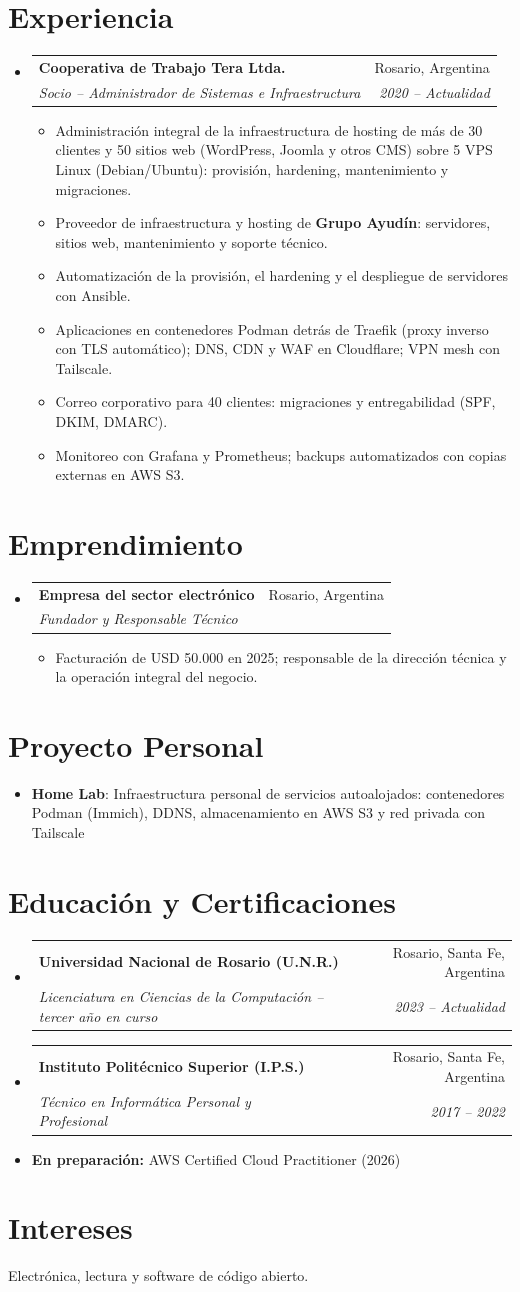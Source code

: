 \documentclass[letterpaper,10pt]{article}
\makeatletter
\newcommand{\resumeItem}[2]{
	\item\small{
		\textbf{#1}{: #2 \vspace{0.5mm}}
	}
}
\newcommand{\resumeItemx}[2]{
	\item\small{
		\textbf{#1}{#2 \vspace{0.5mm}}
	}
}
\newcommand{\resumeSubheading}[4]{
	\vspace{0.5mm}\item
	\begin{tabular*}{0.97\textwidth}[t]{l@{\extracolsep{\fill}}r}
		\textbf{#1} & #2 \vspace{0.5mm}\\
		\textit{\small#3} & \textit{\small #4} \\
	\end{tabular*}\vspace{0.5mm}
}
\newcommand{\resumeSubItem}[2]{\resumeItem{#1}{#2}\vspace{1pt}}
\newcommand{\resumeSubHeadingListStart}{\begin{itemize}[leftmargin=*]}
\newcommand{\resumeSubHeadingListEnd}{\end{itemize}\vspace{-4mm}}
\newcommand{\resumeItemListStart}{\begin{itemize}\vspace{-2pt}}
\newcommand{\resumeItemListEnd}{\end{itemize}\vspace{-2mm}}
\makeatother
\begin{document}
\section{Experiencia}
\resumeSubHeadingListStart
\resumeSubheading{Cooperativa de Trabajo Tera Ltda.}{Rosario, Argentina}{Socio -- Administrador de Sistemas e Infraestructura}{2020 -- Actualidad}
\resumeItemListStart
\resumeItemx{}{Administración integral de la infraestructura de hosting de más de 30 clientes y 50 sitios web (WordPress, Joomla y otros CMS) sobre 5 VPS Linux (Debian/Ubuntu): provisión, hardening, mantenimiento y migraciones.}
\resumeItemx{}{Proveedor de infraestructura y hosting de \textbf{Grupo Ayudín}: servidores, sitios web, mantenimiento y soporte técnico.}
\resumeItemx{}{Automatización de la provisión, el hardening y el despliegue de servidores con Ansible.}
\resumeItemx{}{Aplicaciones en contenedores Podman detrás de Traefik (proxy inverso con TLS automático); DNS, CDN y WAF en Cloudflare; VPN mesh con Tailscale.}
\resumeItemx{}{Correo corporativo para 40 clientes: migraciones y entregabilidad (SPF, DKIM, DMARC).}
\resumeItemx{}{Monitoreo con Grafana y Prometheus; backups automatizados con copias externas en AWS S3.}
\resumeItemListEnd
\resumeSubHeadingListEnd

\section{Emprendimiento}
\resumeSubHeadingListStart
\resumeSubheading{Empresa del sector electrónico}{Rosario, Argentina}{Fundador y Responsable Técnico}{}
\resumeItemListStart
\resumeItemx{}{Facturación de USD 50.000 en 2025; responsable de la dirección técnica y la operación integral del negocio.}
\resumeItemListEnd
\resumeSubHeadingListEnd

\section{Proyecto Personal}
\resumeSubHeadingListStart
\resumeSubItem{Home Lab}{Infraestructura personal de servicios autoalojados: contenedores Podman (Immich), DDNS, almacenamiento en AWS S3 y red privada con Tailscale}
\resumeSubHeadingListEnd

\section{Educación y Certificaciones}
\resumeSubHeadingListStart
\resumeSubheading
{Universidad Nacional de Rosario (U.N.R.)}{Rosario, Santa Fe, Argentina}
{Licenciatura en Ciencias de la Computación -- tercer año en curso}{2023 -- Actualidad}
\resumeSubheading
{Instituto Politécnico Superior (I.P.S.)}{Rosario, Santa Fe, Argentina}
{Técnico en Informática Personal y Profesional}{2017 -- 2022}
\resumeItemx{}{\textbf{En preparación:} AWS Certified Cloud Practitioner (2026)}
\resumeSubHeadingListEnd

\section{Intereses}
\small{Electrónica, lectura y software de código abierto.}

\end{document}
